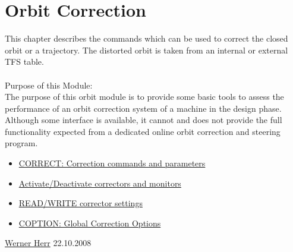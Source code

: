 




\section{Orbit Correction}  This chapter describes the commands which can be used to correct   the closed orbit or a trajectory. The distorted orbit is taken from an internal or external TFS table. 
\\
\\ Purpose of this Module:                              
\\ The purpose of this orbit module is to provide some basic tools to assess the performance of an orbit correction system of a machine in the design phase. 
\\ Although some interface is available, it cannot and does not provide the full functionality expected from a dedicated online orbit correction and steering program. 
\\
\begin{itemize}
	\item \href{co_correct.html}{CORRECT:  Correction commands and parameters}
	\item \href{co_activate.html}{Activate/Deactivate correctors and monitors}
	\item \href{co_corrsave.html}{READ/WRITE corrector settings}
	\item \href{co_option.html}{COPTION:  Global Correction Options}
\end{itemize}\href{http://consult.cern.ch/xwho/people/1808}{Werner Herr} 22.10.2008 







